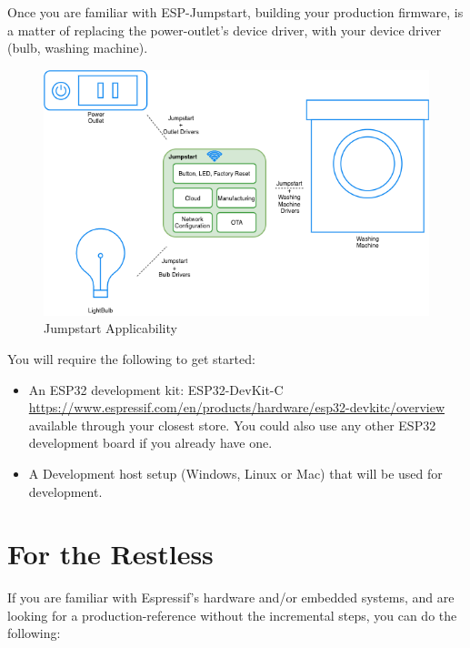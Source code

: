 \documentclass[main.tex]{subfiles}
\begin{document}
Once you are familiar with ESP-Jumpstart, building your production firmware, is a matter of replacing the power-outlet's device driver, with your device driver (bulb, washing machine).

\begin{figure}[h!]
    \centering
    \includegraphics[scale=0.7]{../../_static/jumpstart-outlet-blocks.png}
    \caption{Jumpstart Applicability}
    \label{fig:jumpstart_applicability}
\end{figure}

You will require the following to get started:
\begin{itemize}
\item An ESP32 development kit: ESP32-DevKit-C \url{https://www.espressif.com/en/products/hardware/esp32-devkitc/overview} available through your closest store. You could also use any other ESP32 development board if you already have one.
\item A Development host setup (Windows, Linux or Mac) that will be used for development.
\end{itemize}

\section{For the Restless}
If you are familiar with Espressif's hardware and/or embedded systems, and are looking for a production-reference without the incremental steps, you can do the following: 
\end{document}
